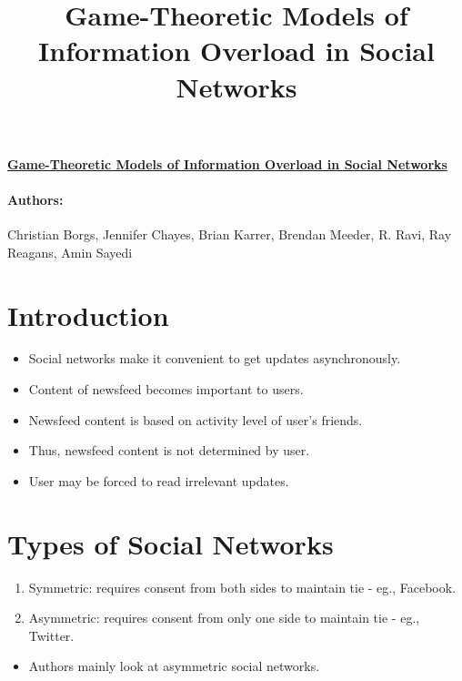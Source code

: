 \documentclass[8pt]{article}
\title{Game-Theoretic Models of Information Overload in Social Networks}
\newcommand{\bi}{\begin{itemize}}
\newcommand{\ei}{\end{itemize}}
\newcommand{\bn}{\begin{enumerate}}
\newcommand{\en}{\end{enumerate}}
\begin{document}
\centerline{\underline{\textbf{Game-Theoretic Models of Information Overload in Social
        Networks}}}
\paragraph{Authors: } Christian Borgs, Jennifer Chayes, Brian Karrer, Brendan Meeder, R.
Ravi, Ray Reagans, Amin Sayedi

\section{Introduction}
\bi \item Social networks make it convenient to get updates asynchronously.
\item Content of newsfeed becomes important to users.
\item Newsfeed content is based on activity level of user's friends.
\item Thus, newsfeed content is not determined by user.
\item User may be forced to read irrelevant updates.
\ei

\section{Types of Social Networks}
\bn
\item Symmetric: requires consent from both sides to maintain tie - eg.,
    Facebook.
\item Asymmetric: requires consent from only one side to maintain tie - eg.,
    Twitter.
\en
\bi
\item Authors mainly look at asymmetric social networks.
\ei
\end{document}
